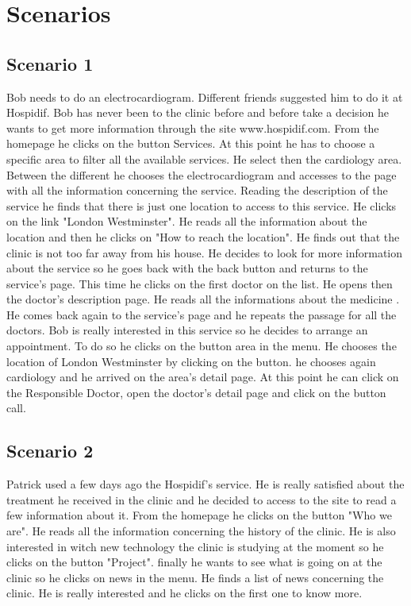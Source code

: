 \documentclass{../Common/Structure/doc_pdf}
\begin{document}
\chapter{Scenarios}
\thispagestyle{fancy}
\section{Scenario 1}
Bob needs to do an electrocardiogram. Different friends suggested him to do it at Hospidif. Bob has never been to the clinic before and before take a decision he wants to get more information through the site www.hospidif.com.
From the homepage he clicks on the button Services. At this point he has to choose a specific area to filter all the available services.
He select then the cardiology area. Between the different he chooses the electrocardiogram  and accesses to the page with all the information concerning the service. Reading the description of the service he finds that there is just one location to access to this service. He clicks on the link "London Westminster". He reads all the information about the location and then he clicks on "How to reach the location". He finds out that the clinic is not too far away from his house. He decides to look for more information about the service so he goes back with the back button and returns to the service's page.
This time he clicks on the first doctor on the list. He opens then the doctor's description page. He reads all the informations about the medicine . He comes back again to the service's page and he repeats the passage for all the doctors. Bob is really interested in this service so he decides to arrange an appointment. To do so he clicks on the button area in the menu. He chooses the location of London Westminster by clicking on the button. he chooses again cardiology and he arrived on the area's detail page. At this point he can click on the Responsible Doctor, open the doctor's detail page and click on the button call.

\newpage

\section{Scenario 2}
Patrick used a few days ago the Hospidif's service. He is really satisfied about the treatment he received in the clinic and he decided to access to the site to read a few information about it. From the homepage he clicks on the button "Who we are". He reads all the information concerning the history of the clinic. He is also interested in witch new technology the clinic is studying at the moment so he clicks on the button "Project". finally he wants to see what is going on at the clinic  so he clicks on news in the menu. He finds a list of news concerning the clinic. He is really interested and he clicks on the first one to know more.
\end{document}
